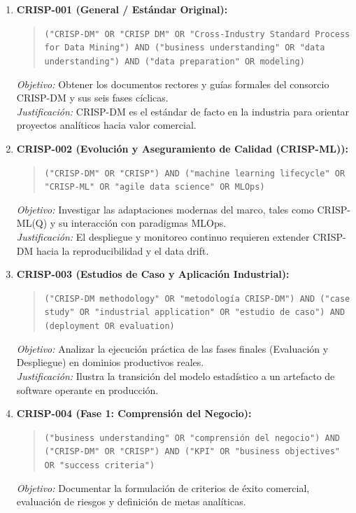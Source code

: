 \begin{enumerate}
  \item \textbf{CRISP-001 (General / Estándar Original):}
  \begin{quote}
  \texttt{("CRISP-DM" OR "CRISP DM" OR "Cross-Industry Standard Process for Data Mining") AND ("business understanding" OR "data understanding") AND ("data preparation" OR modeling)}
  \end{quote}
  \textit{Objetivo:} Obtener los documentos rectores y guías formales del consorcio CRISP-DM y sus seis fases cíclicas.\\
  \textit{Justificación:} CRISP-DM es el estándar de facto en la industria para orientar proyectos analíticos hacia valor comercial.
  \item \textbf{CRISP-002 (Evolución y Aseguramiento de Calidad (CRISP-ML)):}
  \begin{quote}
  \texttt{("CRISP-DM" OR "CRISP") AND ("machine learning lifecycle" OR "CRISP-ML" OR "agile data science" OR MLOps)}
  \end{quote}
  \textit{Objetivo:} Investigar las adaptaciones modernas del marco, tales como CRISP-ML(Q) y su interacción con paradigmas MLOps.\\
  \textit{Justificación:} El despliegue y monitoreo continuo requieren extender CRISP-DM hacia la reproducibilidad y el data drift.
  \item \textbf{CRISP-003 (Estudios de Caso y Aplicación Industrial):}
  \begin{quote}
  \texttt{("CRISP-DM methodology" OR "metodología CRISP-DM") AND ("case study" OR "industrial application" OR "estudio de caso") AND (deployment OR evaluation)}
  \end{quote}
  \textit{Objetivo:} Analizar la ejecución práctica de las fases finales (Evaluación y Despliegue) en dominios productivos reales.\\
  \textit{Justificación:} Ilustra la transición del modelo estadístico a un artefacto de software operante en producción.
  \item \textbf{CRISP-004 (Fase 1: Comprensión del Negocio):}
  \begin{quote}
  \texttt{("business understanding" OR "comprensión del negocio") AND ("CRISP-DM" OR "CRISP") AND ("KPI" OR "business objectives" OR "success criteria")}
  \end{quote}
  \textit{Objetivo:} Documentar la formulación de criterios de éxito comercial, evaluación de riesgos y definición de metas analíticas.\\

\end{enumerate}
